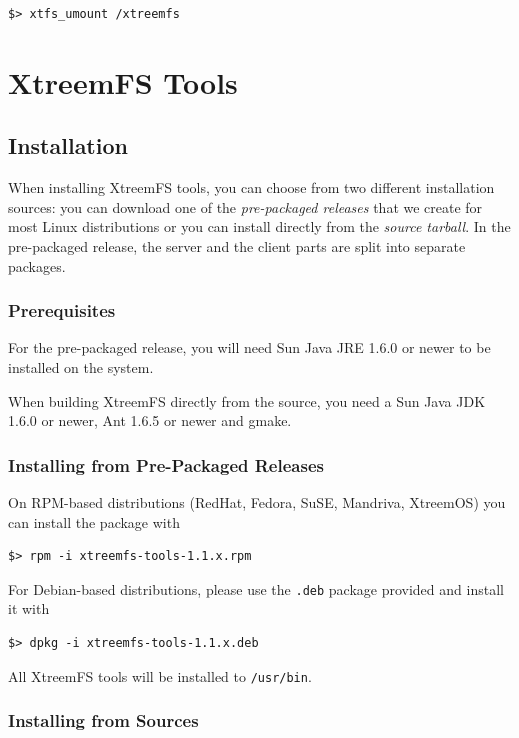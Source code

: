\documentclass[a4paper,10pt]{book}
\begin{document}
\begin{verbatim}
$> xtfs_umount /xtreemfs
\end{verbatim}


\chapter{XtreemFS Tools}

\section{Installation}

When installing XtreemFS tools, you can choose from two different installation sources: you can download one of the \emph{pre-packaged releases} that we create for most Linux distributions or you can install directly from the \emph{source tarball}. In the pre-packaged release, the server and the client parts are split into separate packages.

\subsection{Prerequisites}

For the pre-packaged release, you will need Sun Java JRE 1.6.0 or newer to be installed on the system.

When building XtreemFS directly from the source, you need a Sun Java JDK 1.6.0 or newer, Ant 1.6.5 or newer and gmake.

\subsection{Installing from Pre-Packaged Releases}

On RPM-based distributions (RedHat, Fedora, SuSE, Mandriva, XtreemOS) you can install the package with


\begin{verbatim}
$> rpm -i xtreemfs-tools-1.1.x.rpm
\end{verbatim}


For Debian-based distributions, please use the \texttt{.deb} package provided and install it with


\begin{verbatim}
$> dpkg -i xtreemfs-tools-1.1.x.deb
\end{verbatim}


All XtreemFS tools will be installed to \texttt{/usr/bin}.

\subsection{Installing from Sources}
\end{document}
